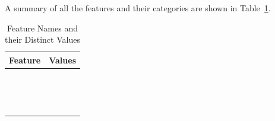\documentclass[
  letterpaper,
  DIV=11,
  numbers=noendperiod]{scrartcl}
\begin{document}
A summary of all the features and their categories are shown in
Table~\ref{tbl-summary}.

\begin{longtable}{>{\raggedright\arraybackslash}p{}>{\raggedright\arraybackslash}p{}}

\caption{\label{tbl-summary}Feature Names and their Distinct Values}

\tabularnewline

\toprule
Feature & Values \\ 
\midrule\addlinespace[2.5pt]
\cellcolor[HTML]{FFFFFF}{Gender} & \cellcolor[HTML]{FFFFFF}{Female, Male} \\ 
\cellcolor[HTML]{FFFFFF}{Smoking} & \cellcolor[HTML]{FFFFFF}{Yes, No} \\ 
\cellcolor[HTML]{FFFFFF}{Hx Smoking} & \cellcolor[HTML]{FFFFFF}{Yes, No} \\ 
\cellcolor[HTML]{FFFFFF}{Hx Radiotherapy} & \cellcolor[HTML]{FFFFFF}{Yes, No} \\ 
\cellcolor[HTML]{FFFFFF}{Thyroid Function} & \cellcolor[HTML]{FFFFFF}{Euthyroid, Clinical Hyperthyroidism, Subclinical Hyperthyroidism, Clinical Hypothyroidism, Subclinical Hypothyroidism} \\ 
\cellcolor[HTML]{FFFFFF}{Physical Examination} & \cellcolor[HTML]{FFFFFF}{Normal, Diffuse goiter, Single nodular goiter-right, Single nodular goiter-left, Multinodular goiter} \\ 
\cellcolor[HTML]{FFFFFF}{Adenopathy} & \cellcolor[HTML]{FFFFFF}{No, Right, Left, Bilateral, Posterior, Extensive} \\ 
\cellcolor[HTML]{FFFFFF}{Pathology} & \cellcolor[HTML]{FFFFFF}{Papillary, Micropapillary, Follicular, Hurthel cell} \\ 
\cellcolor[HTML]{FFFFFF}{Focality} & \cellcolor[HTML]{FFFFFF}{Uni-Focal, Multi-Focal} \\ 
\cellcolor[HTML]{FFFFFF}{Risk} & \cellcolor[HTML]{FFFFFF}{Low, Intermediate, High} \\ 
\cellcolor[HTML]{FFFFFF}{T} & \cellcolor[HTML]{FFFFFF}{T1a, T1b, T2, T3a, T3b, T4a, T4b} \\ 
\cellcolor[HTML]{FFFFFF}{N} & \cellcolor[HTML]{FFFFFF}{N0, N1b, N1a} \\ 
\cellcolor[HTML]{FFFFFF}{M} & \cellcolor[HTML]{FFFFFF}{M0, M1} \\ 
\cellcolor[HTML]{FFFFFF}{Stage} & \cellcolor[HTML]{FFFFFF}{I, II, III, IVA, IVB} \\ 
\cellcolor[HTML]{FFFFFF}{Response} & \cellcolor[HTML]{FFFFFF}{Excellent, Biochemical Incomplete, Structural Incomplete, Indeterminate} \\ 
\bottomrule

\end{longtable}
\end{document}
